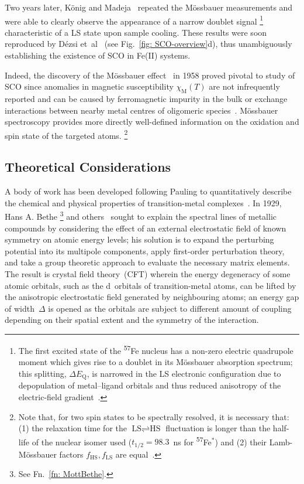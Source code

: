 Two years later, K\"{o}nig and Madeja~\cite{Konig1966} repeated the M\"{o}ssbauer measurements
and were able to clearly observe the appearance of a narrow doublet signal%
\footnote{The first excited state of the \textsuperscript{57}Fe nucleus has
a non-zero electric quadrupole moment which gives rise to a doublet
in its M\"{o}ssbauer absorption spectrum;
this splitting, $\Delta E_\text{Q}$, is narrowed in the LS electronic configuration
due to depopulation of metal--ligand orbitals and
thus reduced anisotropy of the electric-field gradient~\cite{Gutlich2012}.}
characteristic of a LS state upon sample cooling.
These results were soon reproduced by D\'{e}zsi et~al~\cite{Dezsi1967}
(see Fig.~\ref{fig: SCO-overview}d),
thus unambiguously establishing the existence of SCO in Fe(II) systems.

Indeed, the discovery of the M\"{o}ssbauer effect~\cite{Mossbauer1958} in 1958
proved pivotal to study of SCO
since anomalies in magnetic susceptibility $\chi_\text{M}(T)$ are not infrequently reported
and can be caused by ferromagnetic impurity in the bulk or exchange interactions
between nearby metal centres of oligomeric species~\cite{Ewald1964}.
M\"{o}ssbauer spectroscopy provides more directly well-defined information on
the oxidation and spin state of the targeted atoms.%
\footnote{Note that, for two spin states to be spectrally resolved,
it is necessary that:
(1) the relaxation time for the $\text{LS} \rightleftharpoons \text{HS}$ fluctuation is longer than
the half-life of the nuclear isomer used ($t_{1/2} = 98.3$~ns for \textsuperscript{57}Fe$^*$) and
(2) their Lamb-M\"{o}ssbauer factors $f_\text{HS}, f_\text{LS}$ are equal~\cite{SCO-I}.}

\subsection{Theoretical Considerations}
\label{sec: SCO-theory}

A body of work has been developed following Pauling
to quantitatively describe the chemical and physical properties
of transition-metal complexes~\cite{Griffith1957, FiggisBook}.
%
In 1929, Hans A. Bethe%
\footnote{See Fn.~\ref{fn: MottBethe}.} and others~\cite{Bethe1929, Vleck1932, Schlapp1932}
sought to explain the spectral lines of metallic compounds
by considering the effect of an external electrostatic field of known symmetry
on atomic energy levels; his solution is to expand the perturbing potential into its multipole components,
apply first-order perturbation theory, and take a group theoretic approach
to evaluate the necessary matrix elements.
%
The result is crystal field theory~(CFT) wherein the energy degeneracy of some atomic orbitals,
such as the d~orbitals of transition-metal atoms,
can be lifted by the anisotropic electrostatic field generated by neighbouring atoms;
an energy gap of width~$\Delta$ is opened as the orbitals are subject to
different amount of coupling depending on their spatial extent
and the symmetry of the interaction.


